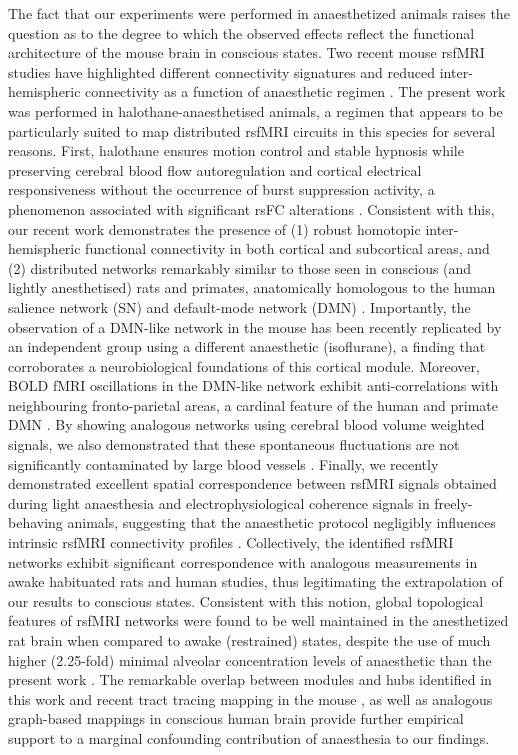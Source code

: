 The fact that our experiments were performed in anaesthetized animals raises the
question as to the degree to which the observed effects reflect the functional
architecture of the mouse brain in conscious states. Two recent mouse rsfMRI
studies have highlighted different connectivity signatures and reduced
inter-hemispheric connectivity as a function of anaesthetic regimen
\parencite{grandjean2014, jonckers2014}. The present work was performed in
halothane-anaesthetised animals, a regimen that appears to be particularly
suited to map distributed rsfMRI circuits in this species for several reasons.
First, halothane ensures motion control and stable hypnosis while preserving
cerebral blood flow autoregulation \parencite{gozzi2007} and cortical electrical
responsiveness \parencite{orth2006} without the occurrence of burst suppression
activity, a phenomenon associated with significant rsFC alterations
\parencite{liu2011}.
Consistent with this, our recent work \parencite{sforazzini2014, sforazzini2016,
zhan2014} demonstrates the presence of (1) robust homotopic inter-hemispheric
functional connectivity in both cortical and subcortical areas, and (2)
distributed networks remarkably similar to those seen in conscious (and lightly
anesthetised) rats and primates, anatomically homologous to the human salience
network (SN) and default-mode network (DMN) \parencite{hutchison2010, lu2012,
rilling2007, schwarz2013, schwarz2012, vincent2007}. Importantly, the
observation of a DMN-like network in the mouse has been recently replicated by
an independent group \parencite{stafford2014} using a different anaesthetic
(isoflurane), a finding that corroborates a neurobiological foundations of this
cortical module. Moreover, BOLD fMRI oscillations in the DMN-like network
exhibit anti-correlations with neighbouring fronto-parietal areas, a cardinal
feature of the human and primate DMN \parencite{fox2005}. By showing analogous
networks using cerebral blood volume weighted signals, we also demonstrated that
these spontaneous fluctuations are not significantly contaminated by large blood
vessels \parencite{sforazzini2016}. Finally, we recently demonstrated excellent
spatial correspondence between rsfMRI signals obtained during light anaesthesia
and electrophysiological coherence signals in freely-behaving animals,
suggesting that the anaesthetic protocol negligibly influences intrinsic rsfMRI
connectivity profiles \parencite{zhan2014}. Collectively, the identified rsfMRI
networks exhibit significant correspondence with analogous measurements in awake
habituated rats and human studies, thus legitimating the extrapolation of our
results to conscious states. Consistent with this notion, global topological
features of rsfMRI networks were found to be well maintained in the anesthetized
rat brain when compared to awake (restrained) states, despite the use of much
higher (2.25-fold) minimal alveolar concentration levels of anaesthetic than the
present work \parencite{eger2003, liang2012, sonner2000}. The remarkable overlap
between modules and hubs identified in this work and recent tract tracing
mapping in the mouse \parencite{zingg2014}, as well as analogous graph-based
mappings in conscious human brain provide further empirical support to a
marginal confounding contribution of anaesthesia to our findings.  

